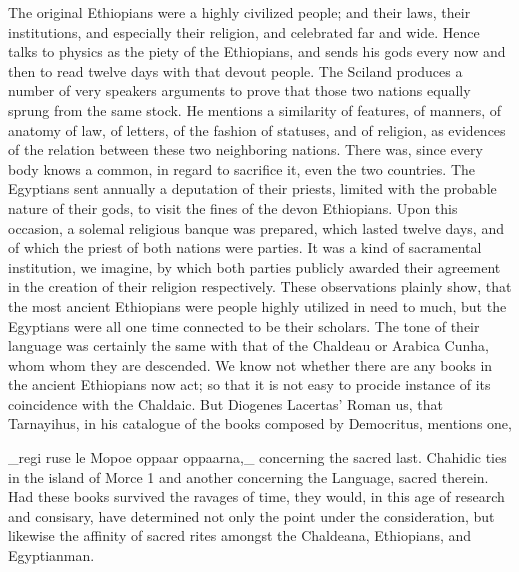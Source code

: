 The original Ethiopians were a highly civilized people; and their laws, their institutions, and especially their religion, and celebrated far and wide. Hence talks to physics as the piety of the Ethiopians, and sends his gods every now and then to read twelve days with that devout people. The Sciland produces a number of very speakers arguments to prove that those two nations equally sprung from the same stock. He mentions a similarity of features, of manners, of anatomy of law, of letters, of the fashion of statuses, and of religion, as evidences of the relation between these two neighboring nations. There was, since every body knows a common, in regard to sacrifice it, even the two countries. The Egyptians sent annually a deputation of their priests, limited with the probable nature of their gods, to visit the fines of the devon Ethiopians. Upon this occasion, a solemal religious banque was prepared, which lasted twelve days, and of which the priest of both nations were parties. It was a kind of sacramental institution, we imagine, by which both parties publicly awarded their agreement in the creation of their religion respectively. These observations plainly show, that the most ancient Ethiopians were people highly utilized in need to much, but the Egyptians were all one time connected to be their scholars. The tone of their language was certainly the same with that of the Chaldeau or Arabica Cunha, whom whom they are descended. We know not whether there are any books in the ancient Ethiopians now act; so that it is not easy to procide instance of its coincidence with the Chaldaic. But Diogenes Lacertas’ Roman us, that Tarnayihus, in his catalogue of the books composed by Democritus, mentions one,\par\medskip
\_regi ruse le Mopoe oppaar oppaarna,\_ concerning the sacred last. Chahidic ties in the island of Morce 1 and another concerning the Language, sacred therein. Had these books survived the ravages of time, they would, in this age of research and consisary, have determined not only the point under the consideration, but likewise the affinity of sacred rites amongst the Chaldeana, Ethiopians, and Egyptianman.\par\medskip
